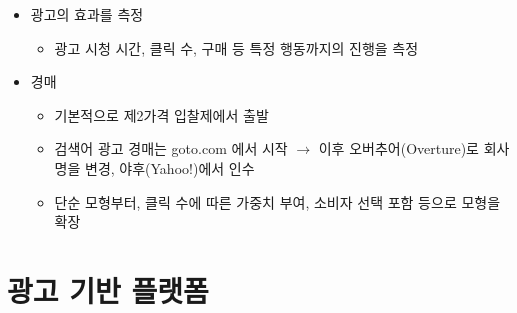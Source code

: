\begin{itemize}
\begin{itemize}
\begin{itemize}
\begin{itemize}
			\end{itemize}
		\end{itemize}
	\item 광고의 효과를 측정
		\begin{itemize}
		\item 광고 시청 시간, 클릭 수, 구매 등 특정 행동까지의 진행을 측정
		\end{itemize}
	\item 경매
		\begin{itemize}
		\item 기본적으로 제2가격 입찰제에서 출발
		\item 검색어 광고 경매는 goto.com 에서 시작 $\rightarrow$ 이후 오버추어(Overture)로 회사 명을 변경, 야후(Yahoo!)에서 인수
		\item 단순 모형부터, 클릭 수에 따른 가중치 부여, 소비자 선택 포함 등으로 모형을 확장
		\end{itemize}
	\end{itemize}
\end{itemize}

\section{광고 기반 플랫폼}
